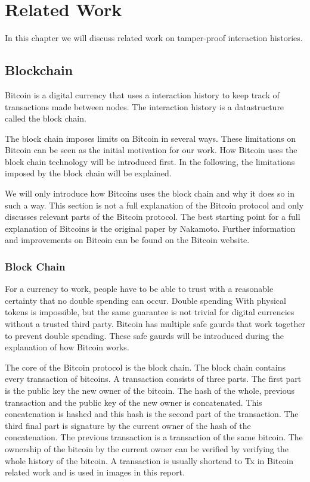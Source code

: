 \chapter{Related Work}
In this chapter we will discuss related work on tamper-proof interaction histories.

\section{Blockchain}
Bitcoin is a digital currency that uses a interaction history 
to keep track of transactions made between nodes.
The interaction history is a datastructure called the block chain.

The block chain imposes limits on Bitcoin in several ways.
These limitations on Bitcoin can be seen as the initial motivation for our work.
How Bitcoin uses the block chain technology will be introduced first.
In the following, the limitations imposed by the block chain will be explained.

We will only introduce how Bitcoins uses the block chain and why it does so in such a way.
This section is not a full explanation of the Bitcoin protocol
and only discusses relevant parts of the Bitcoin protocol.
The best starting point for a full explanation of Bitcoins 
is the original paper by Nakamoto\cite{Nakamoto-bitcoin}.
Further information and improvements on Bitcoin can be found on the Bitcoin website\cite{Bitcoin.org-site}.

\subsection{Block Chain}
For a currency to work, people have to be able to trust with a reasonable certainty that no double spending can occur.
Double spending With physical tokens is impossible,
but the same guarantee is not trivial for digital currencies without a trusted third party.
Bitcoin has multiple safe gaurds that work together to prevent double spending.
These safe gaurds will be introduced during the explanation of how Bitcoin works.

The core of the Bitcoin protocol is the block chain.
The block chain contains every transaction of bitcoins.
A transaction consists of three parts.
The first part is the public key the new owner of the bitcoin.
The hash of the whole, previous transaction and the public key of the new owner is concatenated.
This concatenation is hashed and this hash is the second part of the transaction.
The third final part is signature by the current owner of the hash of the concatenation.
The previous transaction is a transaction of the same bitcoin.
The ownership of the bitcoin by the current owner can be verified
by verifying the whole history of the bitcoin.
A transaction is usually shortend to Tx in Bitcoin related work and is used in images in this report.

